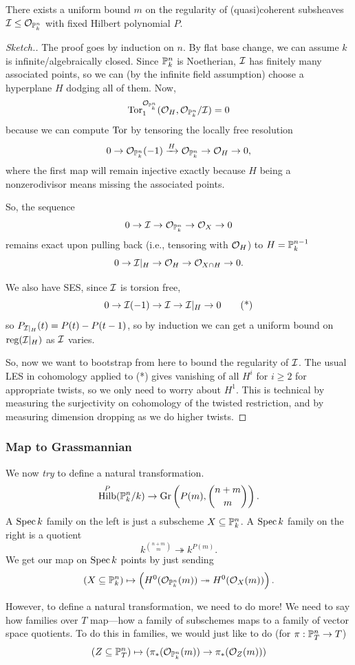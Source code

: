 \documentclass[12pt]{article}
\DeclareMathOperator{\Hilb}{Hilb}
\DeclareMathOperator{\Gr}{Gr}
\begin{document}
\begin{thm}
    There exists a uniform bound $m$ on the regularity of (quasi)coherent subsheaves $\cI\leq \cO_{\P_k^n}$ with fixed Hilbert polynomial $P$.
\end{thm}
\begin{proof}[Sketch.]
    The proof goes by induction on $n$. By flat base change, we can assume $k$ is infinite/algebraically closed. Since $\P^n_k$ is Noetherian, $\cI$ has finitely many associated points, so we can (by the infinite field assumption) choose a hyperplane $H$ dodging all of them. Now,
    \[\Tor^{\cO_{\P_k^n}}_1(\cO_H,\cO_{\P_k^n}/\cI) = 0\]
    because we can compute $\Tor$ by tensoring the locally free resolution
    \[0\to \cO_{\P_k^n}(-1) \xrightarrow{H} \cO_{\P_k^n} \to \cO_H\to 0,\]
    where the first map will remain injective exactly because $H$ being a nonzerodivisor means missing the associated points.
    
    So, the sequence
    \[0\to \cI \to \cO_{\P_k^n} \to \cO_X \to 0\]
    remains exact upon pulling back (i.e., tensoring with $\cO_H$) to $H=\P_k^{n-1}$
    \[0 \to \cI|_H \to \cO_H \to \cO_{X\cap H} \to 0.\]

    We also have SES, since $\cI$ is torsion free,
    \[0\to \cI(-1) \to \cI \to \cI|_H \to 0 \tag{*}\]
    so $P_{\cI|_H}(t) = P(t) - P(t-1)$, so by induction we can get a uniform bound on $\reg(\cI|_H)$ as $\cI$ varies.

    So, now we want to bootstrap from here to bound the regularity of $\cI$. The usual LES in cohomology applied to (*) gives vanishing of all $H^i$ for $i\geq 2$ for appropriate twists, so we only need to worry about $H^1$. This is technical by measuring the surjectivity on cohomology of the twisted restriction, and by measuring dimension dropping as we do higher twists.
\end{proof}

\subsubsection{Map to Grassmannian}

We now \textit{try} to define a natural transformation.
\[\Hilb^P(\P_k^n/k) \to \Gr\left(P(m),\binom{n+m}{m}\right).\]
A $\Spec k$ family on the left is just a subscheme $X\subseteq \P_k^n$. A 
$\Spec k$ family on the right is a quotient
\[k^{\binom{n+m}{m}} \twoheadrightarrow k^{P(m)}.\]
We get our map on $\Spec k$ points by just sending
\[\left(X\subseteq \P_k^n \right) \mapsto \left( H^0(\cO_{\P_k^n}(m)) \twoheadrightarrow H^0(\cO_X(m))\right).\]

However, to define a natural transformation, we need to do more! We need to say how families over $T$ map---how a family of subschemes maps to a family of vector space quotients. To do this in families, we would just like to do (for $\pi: \P_T^n \to T$)
\[(Z\subseteq \P_T^n) \mapsto (\pi_*(\cO_{\P_k^n}(m)) \to \pi_*(\cO_Z(m)))\]





\end{document}
